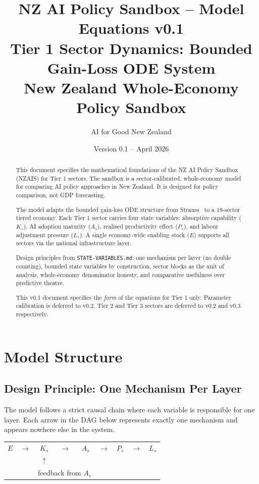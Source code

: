 \documentclass[11pt,a4paper]{article}
\title{%
  NZ AI Policy Sandbox -- Model Equations v0.1\\[0.5em]
  \large Tier 1 Sector Dynamics: Bounded Gain-Loss ODE System\\[0.3em]
  \normalsize New Zealand Whole-Economy Policy Sandbox
}
\author{AI for Good New Zealand}
\date{Version 0.1 -- April 2026}
\begin{document}
\maketitle

\begin{abstract}
This document specifies the mathematical foundations of the NZ AI Policy Sandbox (NZAIS) for Tier 1 sectors. The sandbox is a sector-calibrated, whole-economy model for comparing AI policy approaches in New Zealand. It is designed for policy comparison, not GDP forecasting.

The model adapts the bounded gain-loss ODE structure from Strauss~\cite{strauss2024} to a 19-sector tiered economy. Each Tier 1 sector carries four state variables: absorptive capability ($K_s$), AI adoption maturity ($A_s$), realised productivity effect ($P_s$), and labour adjustment pressure ($L_s$). A single economy-wide enabling stock ($E$) supports all sectors via the national infrastructure layer.

Design principles from \texttt{STATE-VARIABLES.md}: one mechanism per layer (no double counting), bounded state variables by construction, sector blocks as the unit of analysis, whole-economy denominator honesty, and comparative usefulness over predictive theatre.

This v0.1 document specifies the \emph{form} of the equations for Tier 1 only. Parameter calibration is deferred to v0.2. Tier 2 and Tier 3 sectors are deferred to v0.2 and v0.3 respectively.
\end{abstract}

\tableofcontents
\newpage

\section{Model Structure}

\subsection{Design Principle: One Mechanism Per Layer}

The model follows a strict causal chain where each variable is responsible for one layer. Each arrow in the DAG below represents exactly one mechanism and appears nowhere else in the system.

\begin{center}
\begin{tabular}{ccccccccc}
$E$ & $\rightarrow$ & $K_s$ & $\rightarrow$ & $A_s$ & $\rightarrow$ & $P_s$ & $\rightarrow$ & $L_s$ \\
& & $\uparrow$ & & & & & & \\
& & \multicolumn{3}{c}{feedback from $A_s$} & & & &
\end{tabular}
\end{center}
\end{document}
